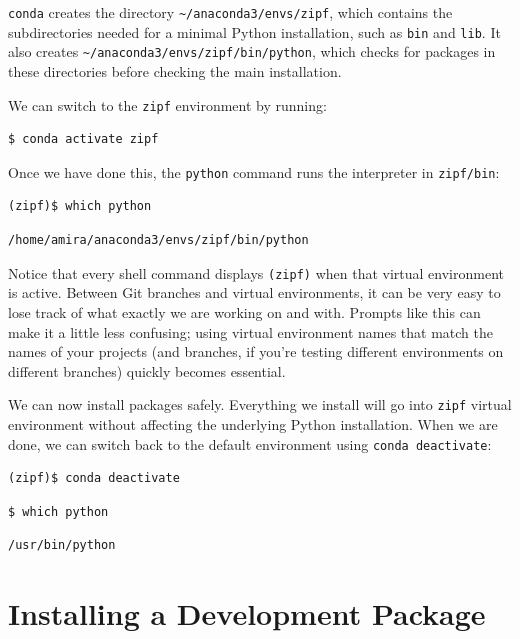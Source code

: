 \documentclass[
]{krantz}
\begin{document}
\texttt{conda} creates the directory \texttt{\textasciitilde{}/anaconda3/envs/zipf},
which contains the subdirectories needed for a minimal Python installation,
such as \texttt{bin} and \texttt{lib}.
It also creates \texttt{\textasciitilde{}/anaconda3/envs/zipf/bin/python},
which checks for packages in these directories before checking the main installation.

We can switch to the \texttt{zipf} environment by running:

\begin{verbatim}
$ conda activate zipf
\end{verbatim}

Once we have done this,
the \texttt{python} command runs the interpreter in \texttt{zipf/bin}:

\begin{verbatim}
(zipf)$ which python
\end{verbatim}

\begin{verbatim}
/home/amira/anaconda3/envs/zipf/bin/python
\end{verbatim}

Notice that every shell command displays \texttt{(zipf)} when that virtual environment is active.
Between Git branches and virtual environments,
it can be very easy to lose track of what exactly we are working on and with.
Prompts like this can make it a little less confusing;
using virtual environment names that match the names of your projects
(and branches, if you're testing different environments on different branches)
quickly becomes essential.

We can now install packages safely.
Everything we install will go into \texttt{zipf} virtual environment
without affecting the underlying Python installation.
When we are done,
we can switch back to the default environment using \texttt{conda\ deactivate}:

\begin{verbatim}
(zipf)$ conda deactivate
\end{verbatim}

\begin{verbatim}
$ which python
\end{verbatim}

\begin{verbatim}
/usr/bin/python
\end{verbatim}

\hypertarget{packaging-installing}{%
\section{Installing a Development Package}\label{packaging-installing}}
\end{document}
